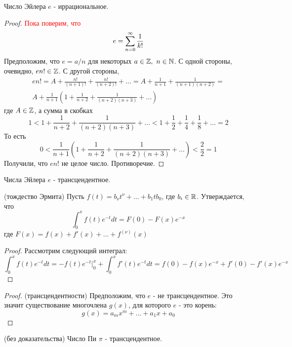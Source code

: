 \begin{theorem}
	Число Эйлера $e$ - иррациональное.
\end{theorem}

\begin{proof}
	\textcolor{red}{Пока поверим, что}
	\[
		e = \sum\limits_{n = 0}^\infty \frac{1}{k!}
	\]
	Предположим, что $e = a/n$ для некоторых $a \in \mathbb{Z},\ n \in \mathbb{N}$. С одной стороны, очевидно, $en! \in \mathbb{Z}$. С другой стороны,
	\begin{multline*}
		en! = A + \frac{n!}{(n + 1)!} + \frac{n!}{(n + 2)!} + \ldots = A + \frac{1}{n + 1} + \frac{1}{(n + 1)(n + 2)} =
		\\
		A + \frac{1}{n + 1} \left(1 + \frac{1}{n + 2} + \frac{1}{(n + 2)(n + 3)} + \ldots\right)
	\end{multline*}
	где $A \in \mathbb{Z}$, а сумма в скобках
	\[
		1 < 1 + \frac{1}{n + 2} + \frac{1}{(n + 2)(n + 3)} + \ldots < 1 + \frac{1}{2} + \frac{1}{4} + \frac{1}{8} + \ldots = 2
	\]
	То есть
	\[
		0 < \frac{1}{n + 1} \left(1 + \frac{1}{n + 2} + \frac{1}{(n + 2)(n + 3)} + \ldots\right) < \frac{2}{2} = 1
	\]
	Получили, что $en!$ не целое число. Противоречие.
\end{proof}

\begin{theorem}
	Числа Эйлера $e$ - трансцендентное.
\end{theorem}

\begin{lemma} (тождество Эрмита)
	Пусть $f(t) = b_{\nu}t^{\nu} + \ldots + b_1 t b_0$, где $b_i \in \mathbb{R}$. Утверждается, что
	\[
		\int_0^x f(t) e^{-t} dt = F(0) - F(x)e^{-x}
	\]
	где $F(x) = f(x) + f'(x) + \ldots + f^{(\nu)}(x)$
\end{lemma}

\begin{proof}
	Рассмотрим следующий интеграл:
	\[
		\int_0^x f(t) e^{-t} dt = -f(t) e^{-t} |_0^x + \int_0^x f'(t) e^{-t} dt = f(0) - f(x)e^{-x} + f'(0) - f'(x)e^{-x}
	\]
\end{proof}

\begin{proof} (трансцендентности)
	Предположим, что $e$ - не трансцендентное. Это значит существование многочлена $g(x)$, для которого $e$ - это корень:
	\[
		g(x) = a_m x^m + \ldots + a_1 x + a_0
	\]
\end{proof}

\begin{theorem} (без доказательства)
	Число Пи $\pi$ - трансцендентное.
\end{theorem}

